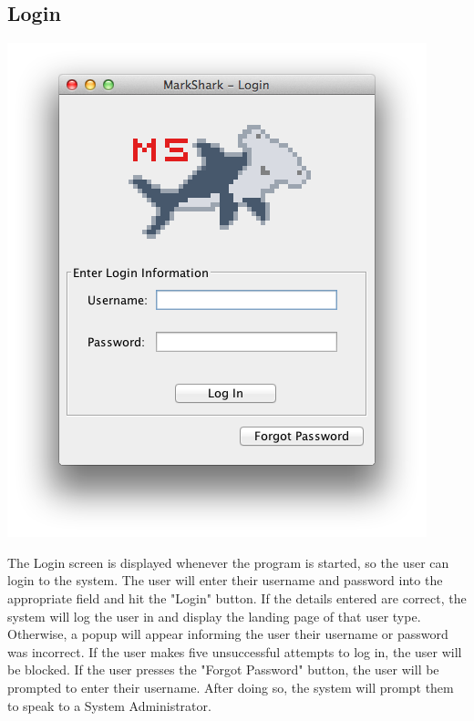 \documentclass{article}
\begin{document}
\subsection{Login}
\label{login}
\centerline{\includegraphics[scale=0.65]{../images/UpdatedUIScreens/Login.png}}
The Login screen is displayed whenever the program is started, so the user can login
to the system. The user will enter their username and password into the
appropriate field and hit the "Login" button. If the details entered are correct,
the system will log the user in and display the landing page of that user type. Otherwise, a popup will appear informing the user their username or password was incorrect. If the user makes five unsuccessful attempts to log in, the user will be blocked. If the user presses the "Forgot Password" button, the user will be prompted to enter their username. After doing so, the system will prompt them to speak to a System Administrator. 
\clearpage
\end{document}
